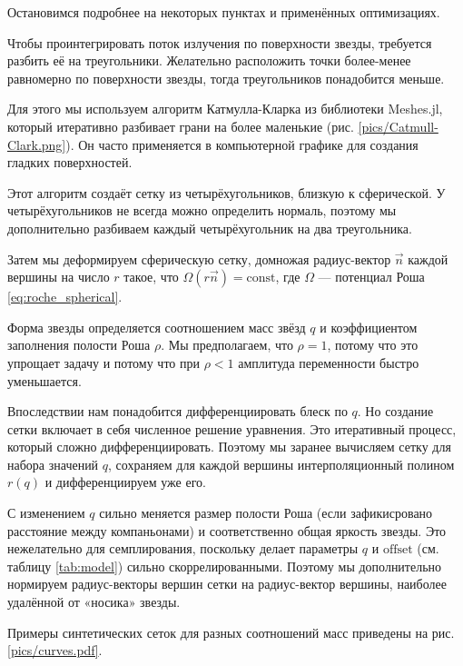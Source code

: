 Остановимся подробнее на некоторых пунктах и применённых оптимизациях.


Чтобы проинтегрировать поток излучения по поверхности звезды, требуется разбить её на треугольники. Желательно расположить точки более-менее равномерно по поверхности звезды, тогда треугольников понадобится меньше.

Для этого мы используем алгоритм Катмулла-Кларка из библиотеки Meshes.jl, который итеративно разбивает грани на более маленькие (рис. \ref{pics/Catmull-Clark.png}). Он часто применяется в компьютерной графике для создания гладких поверхностей.


Этот алгоритм создаёт сетку из четырёхугольников, близкую к сферической. У четырёхугольников не всегда можно определить нормаль, поэтому мы дополнительно разбиваем каждый четырёхугольник на два треугольника.

Затем мы деформируем сферическую сетку, домножая радиус-вектор $\vec n$ каждой вершины на число $r$ такое, что $\Omega(r \vec n) = \text{const}$, где $\Omega$ --- потенциал Роша \eqref{eq:roche_spherical}.

Форма звезды определяется соотношением масс звёзд $q$ и коэффициентом заполнения полости Роша $\rho.$ Мы предполагаем, что $\rho = 1$, потому что это упрощает задачу и потому что при $\rho < 1$ амплитуда переменности быстро уменьшается.

Впоследствии нам понадобится дифференциировать блеск по $q$. Но создание сетки включает в себя численное решение уравнения. Это итеративный процесс, который сложно дифференциировать. Поэтому мы заранее вычисляем сетку для набора значений $q$, сохраняем для каждой вершины интерполяционный полином $r(q)$ и дифференциируем уже его.

С изменением $q$ сильно меняется размер полости Роша (если зафикисровано расстояние между компаньонами) и соответственно общая яркость звезды. Это нежелательно для семплирования, поскольку делает параметры $q$ и $\text{offset}$ (см. таблицу \ref{tab:model}) сильно скоррелированными. Поэтому мы дополнительно нормируем радиус-векторы вершин сетки на радиус-вектор вершины, наиболее удалённой от «носика» звезды.

Примеры синтетических сеток для разных соотношений масс приведены на рис. \ref{pics/curves.pdf}.

